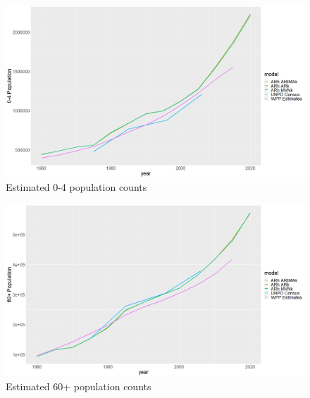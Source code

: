 \documentclass[12pt,a4paper]{article}
\begin{document}
\newpage
\begin{figure}[H]
\includegraphics[width = \linewidth]{Burkina Faso/5/0-4 pop.jpg}
\caption{Estimated 0-4 population counts}
\end{figure}
\begin{figure}[H]
\includegraphics[width = \linewidth]{Burkina Faso/5/60+ pop.jpg}
\caption{Estimated 60+ population counts}
\end{figure}
\end{document}
